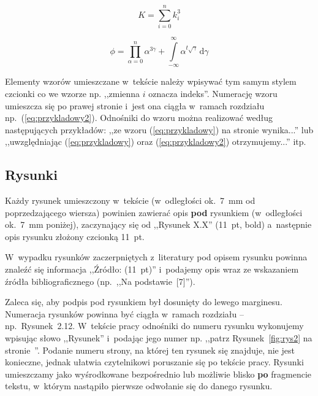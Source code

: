 \documentclass[skorowidz,skroty]{dyplomWEZUT}
\begin{document}
\begin{equation}\label{eq:przykladowy}
	K=\sum_{i=0}^n k_{i}^{3}
\end{equation}

\begin{equation}\label{eq:przykladowy2}
	ϕ=\prod_{α=0}^n α^{3γ} + \int\limits_{-∞}^{∞} \! α^{t\sqrt{γ}} \, \mathup{d}γ
\end{equation}

Elementy wzorów umieszczane w~tekście należy wpisywać tym samym stylem czcionki co we wzorze np. ,,zmienna $i$ oznacza indeks''. Numerację wzoru umieszcza się po prawej stronie i~jest ona ciągła w~ramach rozdziału np.~(\ref{eq:przykladowy2}). Odnośniki do wzoru można realizować według następujących przykładów: ,,ze wzoru (\ref{eq:przykladowy}) na stronie \pageref{eq:przykladowy} wynika...'' lub ,,uwzględniając (\ref{eq:przykladowy}) oraz (\ref{eq:przykladowy2}) otrzymujemy...'' itp.

\subsection{Rysunki}

Każdy rysunek umieszczony w~tekście (w~odległości ok.~7~mm od poprzedzającego wiersza) powinien zawierać opis \textbf{pod} rysunkiem (w~odległości ok.~7~mm poniżej), zaczynający się od ,,Rysunek X.X'' (11~pt, bold) a~następnie opis rysunku złożony czcionką 11~pt.

W~wypadku rysunków zaczerpniętych z~literatury pod opisem rysunku powinna znaleźć się informacja ,,Źródło: (11~pt)'' i~podajemy opis wraz ze wskazaniem źródła bibliograficznego (np.~,,Na podstawie~[7]'').

Zaleca się, aby podpis pod rysunkiem był dosunięty do lewego marginesu. Numeracja rysunków powinna być ciągła w~ramach rozdziału -- np.~Rysunek~2.12. W~tekście pracy odnośniki do numeru rysunku wykonujemy wpisując słowo ,,Rysunek'' i~podając jego numer np. ,,patrz Rysunek~\ref{fig:rys2} na stronie~\pageref{fig:rys2}''. Podanie numeru strony, na której ten rysunek się znajduje, nie jest konieczne, jednak ułatwia czytelnikowi poruszanie się po tekście pracy. Rysunki umieszczamy jako wyśrodkowane bezpośrednio lub możliwie blisko \textbf{po} fragmencie tekstu, w~którym nastąpiło pierwsze odwołanie się do danego rysunku.

%
%
\end{document}
